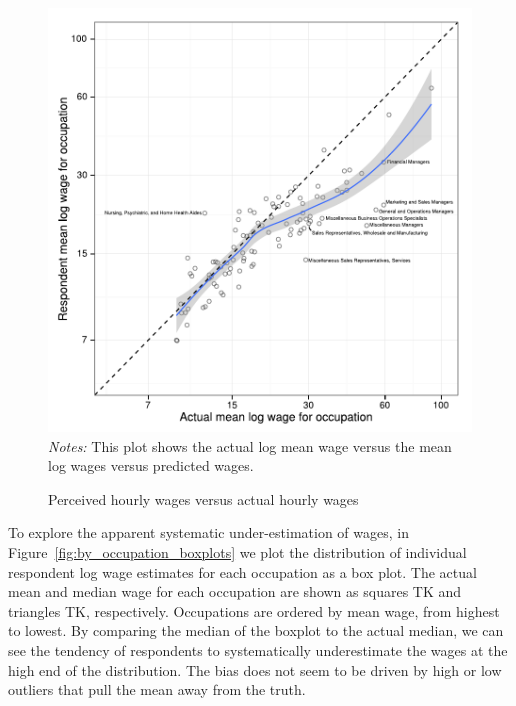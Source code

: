 \documentclass[11pt]{article}
\begin{document}
\begin{figure}
\caption{Perceived hourly wages versus actual hourly wages \label{fig:prediction_scatter}} 
\centering 
\begin{minipage}{0.90 \linewidth}
\includegraphics[width = \linewidth]{./plots/predicted_v_actual.pdf} 
\\
\emph{Notes:} This plot shows the actual log mean wage versus the mean log wages versus predicted wages.  
\end{minipage}  
\end{figure} 

To explore the apparent systematic under-estimation of wages, in Figure~\ref{fig:by_occupation_boxplots} we plot the distribution of individual respondent log wage estimates for each occupation as a box plot. 
The actual mean and median wage for each occupation are shown as squares TK and triangles TK, respectively. 
Occupations are ordered by mean wage, from highest to lowest. 
By comparing the median of the boxplot to the actual median, we can see the tendency of respondents to systematically underestimate the wages at the high end of the distribution. 
The bias does not seem to be driven by high or low outliers that pull the mean away from the truth. 
\end{document}
